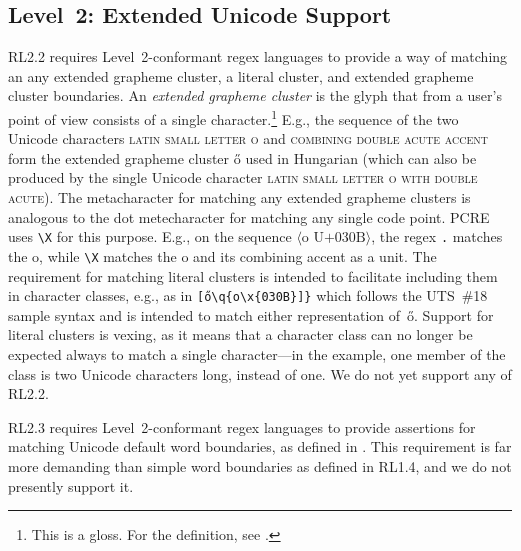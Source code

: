 \documentclass[5p,final,number,sort&compress]{elsarticle}
\newcommand{\re}[1]{\texttt{#1}}
\newcommand*{\whack}{\textbackslash}
\begin{document}
\subsection{Level~2: Extended Unicode Support}

RL2.2 requires Level~2-conformant regex languages to provide a way of matching an any extended grapheme cluster, a literal cluster, and extended grapheme cluster boundaries. An \emph{extended grapheme cluster} is the glyph that from a user's point of view consists of a single character.\footnote{This is a gloss. For the definition, see \citep[\S 3]{uax29}.} E.g., the sequence of the two Unicode characters \textsc{latin small letter o} and \textsc{combining double acute accent} form the extended grapheme cluster \H{o} used in Hungarian (which can also be produced by the single Unicode character \textsc{latin small letter o with double acute}). The metacharacter for matching any extended grapheme clusters is analogous to the dot metecharacter for matching any single code point. PCRE uses \re{\whack X} for this purpose. E.g., on the sequence $\langle \text{o U+030B} \rangle$, the regex \re{.} matches the o, while \re{\whack X} matches the o and its combining accent as a unit. The requirement for matching literal clusters is intended to facilitate including them in character classes, e.g., as in \re{[\H{o}\whack q\{o\whack x\{030B\}]\}} which follows the UTS~\#18 sample syntax and is intended to match either representation of~\H{o}. Support for literal clusters is vexing, as it means that a character class can no longer be expected always to match a single character---in the example, one member of the class is two Unicode characters long, instead of one. We do not yet support any of RL2.2.

RL2.3 requires Level~2-conformant regex languages to provide assertions for matching Unicode default word boundaries, as defined in \citep[\S 4]{uax29}. This requirement is far more demanding than simple word boundaries as defined in RL1.4, and we do not presently support it.
\end{document}
